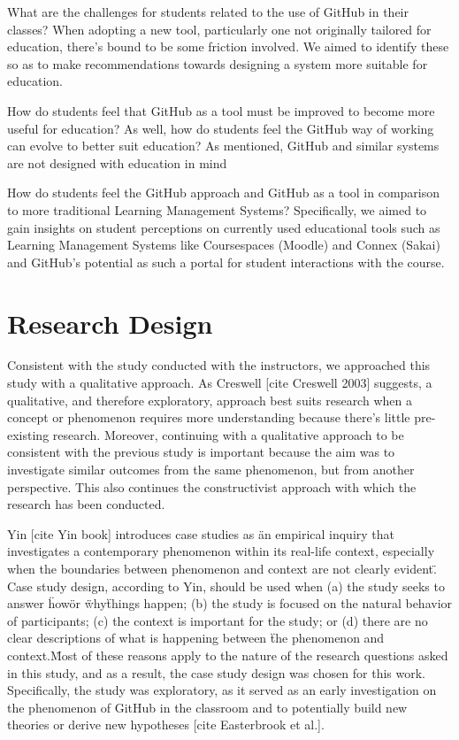 \bigskip
What are the challenges for students related to the use of GitHub in their classes? When adopting a new tool, particularly one not originally tailored for education, there's bound to be some friction involved. We aimed to identify these so as to make recommendations towards designing a system more suitable for education.

\bigskip
How do students feel that GitHub as a tool must be improved to become more useful for education? As well, how do students feel the GitHub way of working can evolve to better suit education? As mentioned, GitHub and similar systems are not designed with education in mind

\bigskip
How do students feel the GitHub approach and GitHub as a tool in comparison to more traditional Learning Management Systems? Specifically, we aimed to gain insights on student perceptions on currently used educational tools such as Learning Management Systems like Coursespaces (Moodle) and Connex (Sakai) and GitHub's potential as such a portal for student interactions with the course.

\section{Research Design}
Consistent with the study conducted with the instructors, we approached this study with a qualitative approach. As Creswell [cite Creswell 2003] suggests, a qualitative, and therefore exploratory, approach best suits research when a concept or phenomenon requires more understanding because there's little pre-existing research. Moreover, continuing with a qualitative approach to be consistent with the previous study is important because the aim was to investigate similar outcomes from the same phenomenon, but from another perspective. This also continues the constructivist approach with which the research has been conducted.

Yin [cite Yin book] introduces case studies as \"an empirical inquiry that investigates a contemporary phenomenon within its real-life context, especially when the boundaries between phenomenon and context are not clearly evident\". Case study design, according to Yin, should be used when (a) the study seeks to answer \"how\" or \"why\" things happen; (b) the study is focused on the natural behavior of participants; (c) the context is important for the study; or (d) there are no clear descriptions of what is happening between \"the phenomenon and context.\" Most of these reasons apply to the nature of the research questions asked in this study, and as a result, the case study design was chosen for this work. Specifically, the study was exploratory, as it served as an early investigation on the phenomenon of GitHub in the classroom and to potentially build new theories or derive new hypotheses [cite Easterbrook et al.].

